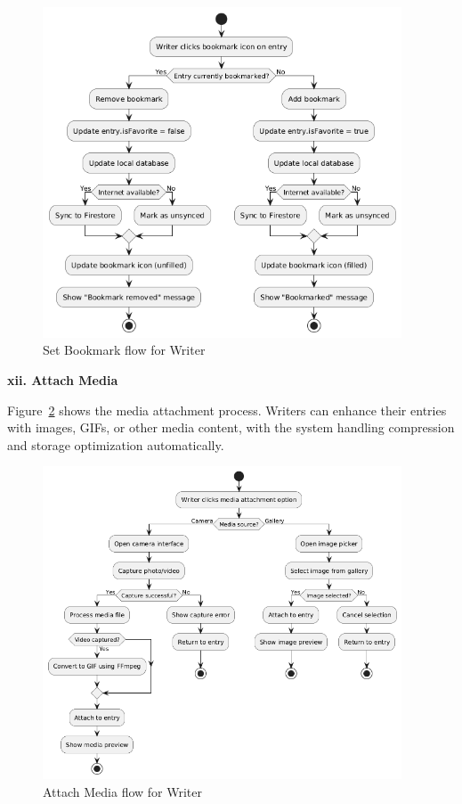 \begin{figure}[H]
\centering
\includegraphics[width=0.95\textwidth,height=0.7\textheight,keepaspectratio]{files/imgs/set_bookmark_flow.png}
\caption{Set Bookmark flow for Writer}
\label{fig:set-bookmark-flow}
\end{figure}
\clearpage

\textbf{xii. Attach Media}

Figure~\ref{fig:attach-media-flow} shows the media attachment process. Writers can enhance their entries with images, GIFs, or other media content, with the system handling compression and storage optimization automatically.

\begin{figure}[H]
\centering
\includegraphics[width=0.95\textwidth,height=0.7\textheight,keepaspectratio]{files/imgs/attach_media_flow.png}
\caption{Attach Media flow for Writer}
\label{fig:attach-media-flow}
\end{figure}
\clearpage

